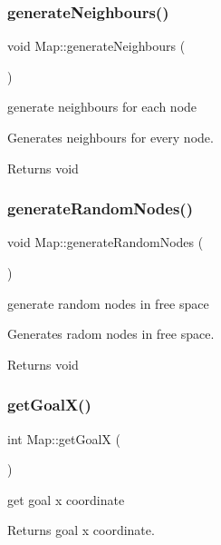 \subsubsection{\texorpdfstring{generate\+Neighbours()}{generateNeighbours()}}
{\footnotesize\ttfamily void Map\+::generate\+Neighbours (\begin{DoxyParamCaption}{ }\end{DoxyParamCaption})}



generate neighbours for each node 

Generates neighbours for every node.

\begin{DoxyReturn}{Returns}
void 
\end{DoxyReturn}
\mbox{\label{classMap_a954ff479022d478a670326956a7223f6}} 
\subsubsection{\texorpdfstring{generate\+Random\+Nodes()}{generateRandomNodes()}}
{\footnotesize\ttfamily void Map\+::generate\+Random\+Nodes (\begin{DoxyParamCaption}{ }\end{DoxyParamCaption})}



generate random nodes in free space 

Generates radom nodes in free space.

\begin{DoxyReturn}{Returns}
void 
\end{DoxyReturn}
\mbox{\label{classMap_a6a69daf582036958e6a08651426b7f47}} 
\subsubsection{\texorpdfstring{get\+Goal\+X()}{getGoalX()}}
{\footnotesize\ttfamily int Map\+::get\+GoalX (\begin{DoxyParamCaption}{ }\end{DoxyParamCaption})}



get goal x coordinate 

Returns goal x coordinate.


